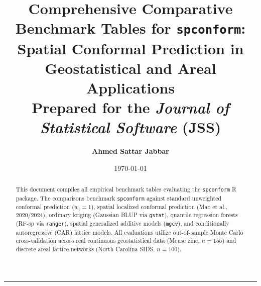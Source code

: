 \documentclass[11pt,a4paper]{article}
\title{\textbf{Comprehensive Comparative Benchmark Tables for \texttt{spconform}:\\
Spatial Conformal Prediction in Geostatistical and Areal Applications}\\
\large Prepared for the \textit{Journal of Statistical Software} (JSS)}
\author{\textbf{Ahmed Sattar Jabbar}}
\date{\today}
\begin{document}
\maketitle

\begin{abstract}
This document compiles all empirical benchmark tables evaluating the \texttt{spconform} R package. The comparisons benchmark \texttt{spconform} against standard unweighted conformal prediction ($w_i = 1$), spatial localized conformal prediction (Mao et al., 2020/2024), ordinary kriging (Gaussian BLUP via \texttt{gstat}), quantile regression forests (RF-sp via \texttt{ranger}), spatial generalized additive models (\texttt{mgcv}), and conditionally autoregressive (CAR) lattice models. All evaluations utilize out-of-sample Monte Carlo cross-validation across real continuous geostatistical data (Meuse zinc, $n=155$) and discrete areal lattice networks (North Carolina SIDS, $n=100$).
\end{abstract}

\vspace{1em}
\hrule
\vspace{1em}
\end{document}
